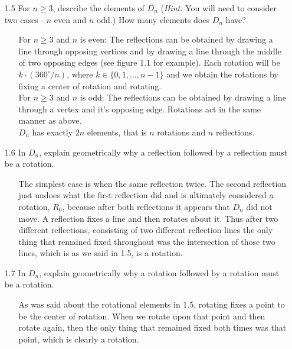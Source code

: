 \documentclass[12pt]{article}
\begin{document}
\begin{enumerate}
\item[1.5] For $n \geq 3$, describe the elements of $D_n$ (\emph{Hint:} You will need to
consider two cases - $n$ even and $n$ odd.) How many elements does $D_n$ have?
\begin{enumerate}
\item[] For $n \geq 3$ and $n$ is even: The reflections can be obtained by drawing a line through
opposing vertices and by drawing a line through the middle of two opposing edges (see figure 1.1
for example). Each rotation will be $k \cdot (360^\circ /n)$, where $k \in \{0, 1, \ldots, n-1\}$
and we obtain the rotations by 
fixing a center of rotation and rotating. \\
For $n \geq 3$ and $n$ is odd: The reflections can be obtained by drawing a line through a
vertex and it's opposing edge. Rotations act in the same manner as above. \\
$D_n$ has exactly $2n$ elements, that is $n$ rotations and $n$ reflections.
\end{enumerate}

\item[1.6] In $D_n$, explain geometrically why a reflection followed by a reflection must be a rotation.
\begin{enumerate}
\item[] The simplest case is when the same reflection twice. The second reflection just
undoes what the first reflection did and is ultimately considered a rotation, $R_0$, because
after both reflections it appears that $D_n$ did not move. A reflection fixes a line and 
then rotates about it. Thus after two different reflections, consisting of two different
reflection lines the only thing that remained fixed throughout was the intersection of
those two lines, which is as we said in 1.5, is a rotation.
\end{enumerate}

\item[1.7] In $D_n$, explain geometrically why a rotation followed by a rotation must be a rotation.
\begin{enumerate}
\item[] As was said about the rotational elements in 1.5, rotating fixes a point to be the 
center of rotation. When we rotate upon that point and then rotate again, then the only thing
that remained fixed both times was that point, which is clearly a rotation.
\end{enumerate}



\end{enumerate}
\end{document}
